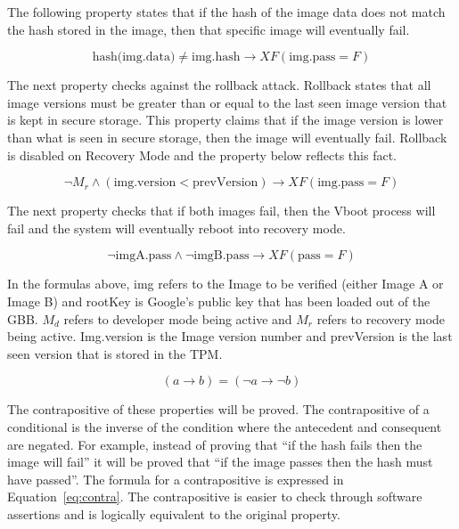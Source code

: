 The following property states that if the hash of the image data does not match the hash stored in the image, then that specific image will eventually fail.

\begin{equation} \label{eq:hash_cor}
    \text{hash(img.data)} \neq \text{img.hash} \to XF (\text{img.pass} = F)
\end{equation}

The next property checks against the rollback attack. 
Rollback states that all image versions must be greater than or equal to the last seen image version that is kept in secure storage. 
This property claims that if the image version is lower than what is seen in secure storage, then the image will eventually fail.
Rollback is disabled on Recovery Mode and the property below reflects this fact.

\begin{equation} \label{eq:rollback}
    \lnot M_r \land (\text{img.version} < \text{prevVersion}) \to XF (\text{img.pass} = F)
\end{equation}

The next property checks that if both images fail, then the Vboot process will fail and the system will eventually reboot into recovery mode.

\begin{equation} \label{eq:both-fail}
    \lnot \text{imgA.pass} \land \lnot \text{imgB.pass} \to XF (\text{pass} = F)
\end{equation}



In the formulas above, img refers to the Image to be verified (either Image A or Image B)  and rootKey is Google's public key that has been loaded out of the GBB.
$M_d$ refers to developer mode being active and $M_r$ refers to recovery mode being active.
Img.version is the Image version number and prevVersion is the last seen version that is stored in the TPM\@.

\begin{equation} \label{eq:contra}
    (a \to b) = (\lnot a \to \lnot b)
\end{equation}

The contrapositive of these properties will be proved.
The contrapositive of a conditional is the inverse of the condition where the antecedent and consequent are negated.
For example, instead of proving that ``if the hash fails then the image will fail'' it will be proved that ``if the image passes then the hash must have passed''. 
The formula for a contrapositive is expressed in Equation~\ref{eq:contra}.
The contrapositive is easier to check through software assertions and is logically equivalent to the original property.


